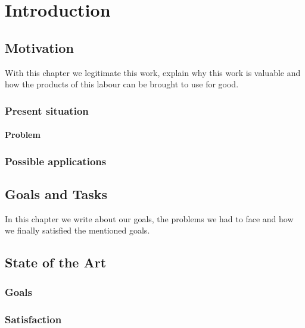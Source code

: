 \chapter{Introduction}
\label{sec:introduction}

\section{Motivation}

With this chapter we legitimate this work, explain why this work is valuable and how the products of this labour can be brought to use for good.

\subsection{Present situation}

\subsubsection{Problem}

\subsection{Possible applications}

\section{Goals and Tasks}

In this chapter we write about our goals, the problems we had to face and how we finally satisfied the mentioned goals.

\section{State of the Art}

\subsection{Goals}

\subsection{Satisfaction}
